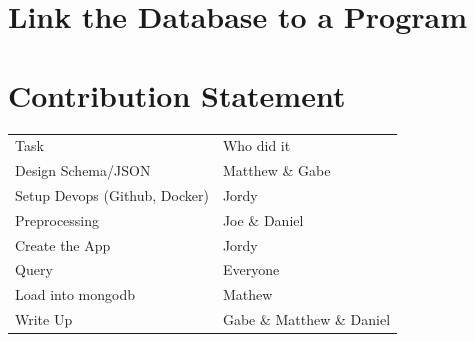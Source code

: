 \documentclass[11pt]{article}
\begin{document}
\section{Link the Database to a Program}
\label{sec:org2aada2e}

\section{Contribution Statement}
\label{sec:org657dedd}
\begin{center}
\begin{tabular}{ll}
\hline
Task & Who did it\\
Design Schema/JSON & Matthew \& Gabe\\
Setup Devops (Github, Docker) & Jordy\\
Preprocessing & Joe \& Daniel\\
Create the App & Jordy\\
Query & Everyone\\
Load into mongodb & Mathew\\
Write Up & Gabe \& Matthew \& Daniel\\
\hline
\end{tabular}
\end{center}
\end{document}
